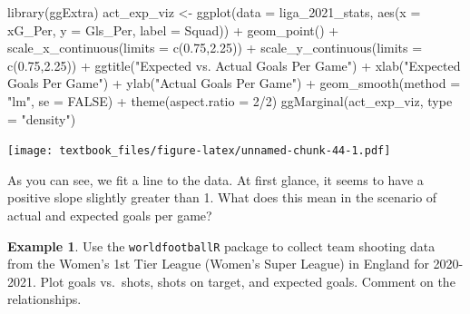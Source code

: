 \documentclass[
  11pt,
]{book}
\newenvironment{Shaded}{\begin{snugshade}}{\end{snugshade}}
\newcommand{\AttributeTok}[1]{\textcolor[rgb]{0.77,0.63,0.00}{#1}}
\newcommand{\ConstantTok}[1]{\textcolor[rgb]{0.00,0.00,0.00}{#1}}
\newcommand{\DecValTok}[1]{\textcolor[rgb]{0.00,0.00,0.81}{#1}}
\newcommand{\FloatTok}[1]{\textcolor[rgb]{0.00,0.00,0.81}{#1}}
\newcommand{\FunctionTok}[1]{\textcolor[rgb]{0.00,0.00,0.00}{#1}}
\newcommand{\NormalTok}[1]{#1}
\newcommand{\OtherTok}[1]{\textcolor[rgb]{0.56,0.35,0.01}{#1}}
\newcommand{\SpecialCharTok}[1]{\textcolor[rgb]{0.00,0.00,0.00}{#1}}
\newcommand{\StringTok}[1]{\textcolor[rgb]{0.31,0.60,0.02}{#1}}
\theoremstyle{definition}
\theoremstyle{definition}
\newtheorem{example}{Example}[chapter]
\theoremstyle{definition}
\theoremstyle{definition}
\theoremstyle{remark}
\begin{document}
\begin{Shaded}
\begin{Highlighting}[]
\FunctionTok{library}\NormalTok{(ggExtra)}
\NormalTok{act\_exp\_viz }\OtherTok{\textless{}{-}} \FunctionTok{ggplot}\NormalTok{(}\AttributeTok{data =}\NormalTok{ liga\_2021\_stats, }
                      \FunctionTok{aes}\NormalTok{(}\AttributeTok{x =}\NormalTok{ xG\_Per, }\AttributeTok{y =}\NormalTok{ Gls\_Per, }\AttributeTok{label =}\NormalTok{ Squad)) }\SpecialCharTok{+}
  \FunctionTok{geom\_point}\NormalTok{() }\SpecialCharTok{+}
  \FunctionTok{scale\_x\_continuous}\NormalTok{(}\AttributeTok{limits =} \FunctionTok{c}\NormalTok{(}\FloatTok{0.75}\NormalTok{,}\FloatTok{2.25}\NormalTok{)) }\SpecialCharTok{+}
  \FunctionTok{scale\_y\_continuous}\NormalTok{(}\AttributeTok{limits =} \FunctionTok{c}\NormalTok{(}\FloatTok{0.75}\NormalTok{,}\FloatTok{2.25}\NormalTok{)) }\SpecialCharTok{+}
  \FunctionTok{ggtitle}\NormalTok{(}\StringTok{"Expected vs. Actual Goals Per Game"}\NormalTok{) }\SpecialCharTok{+}
  \FunctionTok{xlab}\NormalTok{(}\StringTok{"Expected Goals Per Game"}\NormalTok{) }\SpecialCharTok{+}
  \FunctionTok{ylab}\NormalTok{(}\StringTok{"Actual Goals Per Game"}\NormalTok{) }\SpecialCharTok{+}
  \FunctionTok{geom\_smooth}\NormalTok{(}\AttributeTok{method =} \StringTok{"lm"}\NormalTok{, }\AttributeTok{se =} \ConstantTok{FALSE}\NormalTok{) }\SpecialCharTok{+}
  \FunctionTok{theme}\NormalTok{(}\AttributeTok{aspect.ratio =} \DecValTok{2}\SpecialCharTok{/}\DecValTok{2}\NormalTok{)}
\FunctionTok{ggMarginal}\NormalTok{(act\_exp\_viz, }\AttributeTok{type =} \StringTok{"density"}\NormalTok{)}
\end{Highlighting}
\end{Shaded}

\texttt{[image: textbook\_files/figure-latex/unnamed-chunk-44-1.pdf]}

As you can see, we fit a line to the data. At first glance, it seems to have a positive slope slightly greater than 1. What does this mean in the scenario of actual and expected goals per game?

\newpage

\begin{example}
Use the \texttt{worldfootballR} package to collect team shooting data from the Women's 1st Tier League (Women's Super League) in England for 2020-2021. Plot goals vs.~shots, shots on target, and expected goals. Comment on the relationships.
\end{example}
\end{document}
